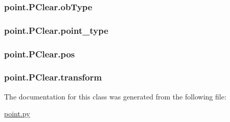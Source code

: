 \subsubsection[{ob\+Type}]{\setlength{\rightskip}{0pt plus 5cm}point.\+P\+Clear.\+ob\+Type}\label{classpoint_1_1_p_clear_af6452e3be04889160c538093e5eb53ff}
\hypertarget{classpoint_1_1_p_clear_a2a692cd131203f0018a81476bba88e23}{}
\subsubsection[{point\+\_\+type}]{\setlength{\rightskip}{0pt plus 5cm}point.\+P\+Clear.\+point\+\_\+type}\label{classpoint_1_1_p_clear_a2a692cd131203f0018a81476bba88e23}
\hypertarget{classpoint_1_1_p_clear_a6051eea4188c6f2acb1496e95bdc7f06}{}
\subsubsection[{pos}]{\setlength{\rightskip}{0pt plus 5cm}point.\+P\+Clear.\+pos}\label{classpoint_1_1_p_clear_a6051eea4188c6f2acb1496e95bdc7f06}
\hypertarget{classpoint_1_1_p_clear_ae84c174d23d054f5109d278998895803}{}
\subsubsection[{transform}]{\setlength{\rightskip}{0pt plus 5cm}point.\+P\+Clear.\+transform}\label{classpoint_1_1_p_clear_ae84c174d23d054f5109d278998895803}


The documentation for this class was generated from the following file\+:\begin{DoxyCompactItemize}
\item 
\hyperlink{point_8py}{point.\+py}\end{DoxyCompactItemize}
